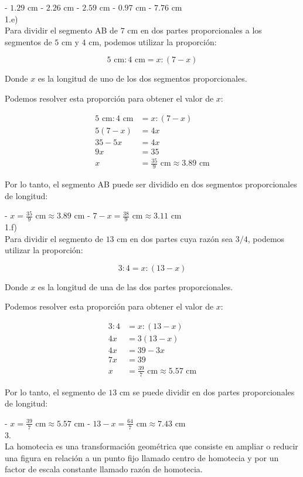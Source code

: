 \documentclass{article}
\begin{document}
- $1.29$ cm
- $2.26$ cm
- $2.59$ cm
- $0.97$ cm
- $7.76$ cm
\\
{\Large 1.e)}
\\
Para dividir el segmento AB de $7$ cm en dos partes proporcionales a los segmentos de $5$ cm y $4$ cm, podemos utilizar la proporción:

$$5\text{ cm} : 4\text{ cm} = x : (7 - x)$$

Donde $x$ es la longitud de uno de los dos segmentos proporcionales.

Podemos resolver esta proporción para obtener el valor de $x$:

$$\begin{aligned}
	5\text{ cm} : 4\text{ cm} &= x : (7 - x) \\
	5(7 - x) &= 4x \\
	35 - 5x &= 4x \\
	9x &= 35 \\
	x &= \frac{35}{9}\text{ cm} \approx 3.89\text{ cm}
\end{aligned}$$

Por lo tanto, el segmento AB puede ser dividido en dos segmentos proporcionales de longitud:

- $x = \frac{35}{9}\text{ cm} \approx 3.89\text{ cm}$
- $7 - x = \frac{38}{9}\text{ cm} \approx 3.11\text{ cm}$
\\
{\Large 1.f)}
\\
Para dividir el segmento de $13$ cm en dos partes cuya razón sea $3/4$, podemos utilizar la proporción:

$$3 : 4 = x : (13 - x)$$

Donde $x$ es la longitud de una de las dos partes proporcionales.

Podemos resolver esta proporción para obtener el valor de $x$:

$$\begin{aligned}
	3 : 4 &= x : (13 - x) \\
	4x &= 3(13 - x) \\
	4x &= 39 - 3x \\
	7x &= 39 \\
	x &= \frac{39}{7}\text{ cm} \approx 5.57\text{ cm}
\end{aligned}$$

Por lo tanto, el segmento de $13$ cm se puede dividir en dos partes proporcionales de longitud:

- $x = \frac{39}{7}\text{ cm} \approx 5.57\text{ cm}$
- $13 - x = \frac{64}{7}\text{ cm} \approx 7.43\text{ cm}$
\\
{\Large 3.}
\\
La homotecia es una transformación geométrica que consiste en ampliar o reducir una figura en relación a un punto fijo llamado centro de homotecia y por un factor de escala constante llamado razón de homotecia.
\end{document}
